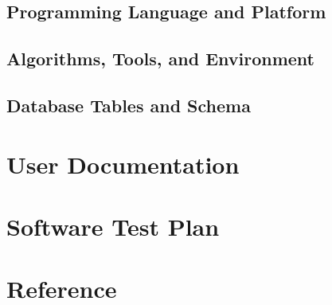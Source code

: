 \documentclass[11pt]{article}
\begin{document}
\subsection{Programming Language and Platform}

\subsection{Algorithms, Tools, and Environment}

\subsection{Database Tables and Schema}

\section{User Documentation}

\section{Software Test Plan}

\section{Reference}
\end{document}
